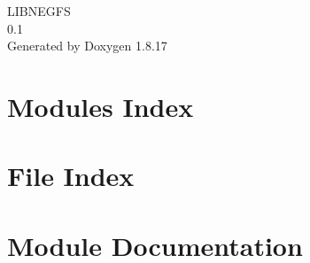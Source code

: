\let\mypdfximage\pdfximage\def\pdfximage{\immediate\mypdfximage}\documentclass[twoside]{book}
\newcommand{\+}{\discretionary{\mbox{\scriptsize$\hookleftarrow$}}{}{}}
\newcommand{\clearemptydoublepage}{%
  \newpage{\pagestyle{empty}\cleardoublepage}%
}
\begin{document}
\hypersetup{pageanchor=false,
             bookmarksnumbered=true,
             pdfencoding=unicode
            }
\begin{titlepage}
\vspace*{7cm}
\begin{center}%
{\Large L\+I\+B\+N\+E\+G\+FS \\[1ex]\large 0.\+1 }\\
\vspace*{1cm}
{\large Generated by Doxygen 1.8.17}\\
\end{center}
\end{titlepage}
\clearemptydoublepage
{}
\tableofcontents
\clearemptydoublepage
{}
\hypersetup{pageanchor=true}

\chapter{Modules Index}

\chapter{File Index}

\chapter{Module Documentation}

\end{document}

